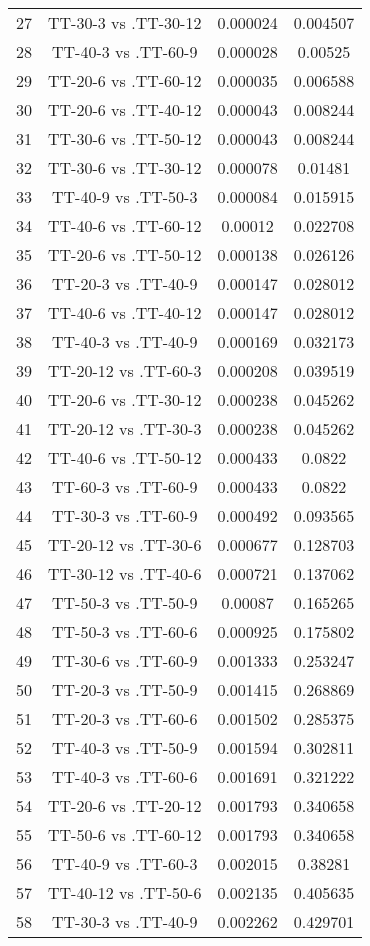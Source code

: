 \documentclass[a4paper,10pt]{article}
\begin{document}
\begin{landscape}
\begin{table}[!htp]
\begin{tabular}{cccc}
27&TT-30-3 vs .TT-30-12&0.000024&0.004507\\
28&TT-40-3 vs .TT-60-9&0.000028&0.00525\\
29&TT-20-6 vs .TT-60-12&0.000035&0.006588\\
30&TT-20-6 vs .TT-40-12&0.000043&0.008244\\
31&TT-30-6 vs .TT-50-12&0.000043&0.008244\\
32&TT-30-6 vs .TT-30-12&0.000078&0.01481\\
33&TT-40-9 vs .TT-50-3&0.000084&0.015915\\
34&TT-40-6 vs .TT-60-12&0.00012&0.022708\\
35&TT-20-6 vs .TT-50-12&0.000138&0.026126\\
36&TT-20-3 vs .TT-40-9&0.000147&0.028012\\
37&TT-40-6 vs .TT-40-12&0.000147&0.028012\\
38&TT-40-3 vs .TT-40-9&0.000169&0.032173\\
39&TT-20-12 vs .TT-60-3&0.000208&0.039519\\
40&TT-20-6 vs .TT-30-12&0.000238&0.045262\\
41&TT-20-12 vs .TT-30-3&0.000238&0.045262\\
42&TT-40-6 vs .TT-50-12&0.000433&0.0822\\
43&TT-60-3 vs .TT-60-9&0.000433&0.0822\\
44&TT-30-3 vs .TT-60-9&0.000492&0.093565\\
45&TT-20-12 vs .TT-30-6&0.000677&0.128703\\
46&TT-30-12 vs .TT-40-6&0.000721&0.137062\\
47&TT-50-3 vs .TT-50-9&0.00087&0.165265\\
48&TT-50-3 vs .TT-60-6&0.000925&0.175802\\
49&TT-30-6 vs .TT-60-9&0.001333&0.253247\\
50&TT-20-3 vs .TT-50-9&0.001415&0.268869\\
51&TT-20-3 vs .TT-60-6&0.001502&0.285375\\
52&TT-40-3 vs .TT-50-9&0.001594&0.302811\\
53&TT-40-3 vs .TT-60-6&0.001691&0.321222\\
54&TT-20-6 vs .TT-20-12&0.001793&0.340658\\
55&TT-50-6 vs .TT-60-12&0.001793&0.340658\\
56&TT-40-9 vs .TT-60-3&0.002015&0.38281\\
57&TT-40-12 vs .TT-50-6&0.002135&0.405635\\
58&TT-30-3 vs .TT-40-9&0.002262&0.429701\\

\end{tabular}
\end{table}
\end{landscape}
\end{document}
